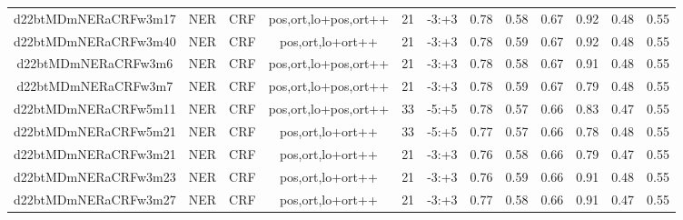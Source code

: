 \documentclass[a4paper]{article}
\begin{document}
\begin{landscape}
\begin{center}
\begin{tabular}{ |c|c|c|c|c|c|c|c|c|c|c|c|}
 	
 
 	
 		
 		\small{ d22btMDmNERaCRFw3m17 } & NER & CRF & pos,ort,lo+pos,ort++  &  21 &  -3:+3  &  0.78 & 0.58 & 0.67  &  0.92 & 0.48 & 0.55 \\
 		

 	
 
 	
 		
 		\small{ d22btMDmNERaCRFw3m40 } & NER & CRF & pos,ort,lo+ort++  &  21 &  -3:+3  &  0.78 & 0.59 & 0.67  &  0.92 & 0.48 & 0.55 \\
 		

 	
 
 	
 		
 		\small{ d22btMDmNERaCRFw3m6 } & NER & CRF & pos,ort,lo+pos,ort++  &  21 &  -3:+3  &  0.78 & 0.58 & 0.67  &  0.91 & 0.48 & 0.55 \\
 		

 	
 
 	
 		
 		\small{ d22btMDmNERaCRFw3m7 } & NER & CRF & pos,ort,lo+pos,ort++  &  21 &  -3:+3  &  0.78 & 0.59 & 0.67  &  0.79 & 0.48 & 0.55 \\
 		

 	
 
 	
 		
 		\small{ d22btMDmNERaCRFw5m11 } & NER & CRF & pos,ort,lo+pos,ort++  &  33 &  -5:+5  &  0.78 & 0.57 & 0.66  &  0.83 & 0.47 & 0.55 \\
 		

 	
 
 	
 		
 		\small{ d22btMDmNERaCRFw5m21 } & NER & CRF & pos,ort,lo+ort++  &  33 &  -5:+5  &  0.77 & 0.57 & 0.66  &  0.78 & 0.48 & 0.55 \\
 		

 	
 
 	
 		
 		\small{ d22btMDmNERaCRFw3m21 } & NER & CRF & pos,ort,lo+ort++  &  21 &  -3:+3  &  0.76 & 0.58 & 0.66  &  0.79 & 0.47 & 0.55 \\
 		

 	
 
 	
 		
 		\small{ d22btMDmNERaCRFw3m23 } & NER & CRF & pos,ort,lo+ort++  &  21 &  -3:+3  &  0.76 & 0.59 & 0.66  &  0.91 & 0.48 & 0.55 \\
 		

 	
 
 	
 		
 		\small{ d22btMDmNERaCRFw3m27 } & NER & CRF & pos,ort,lo+ort++  &  21 &  -3:+3  &  0.77 & 0.58 & 0.66  &  0.91 & 0.47 & 0.55 \\
 		


\end{tabular}
\end{center}
\end{landscape}
\end{document}
